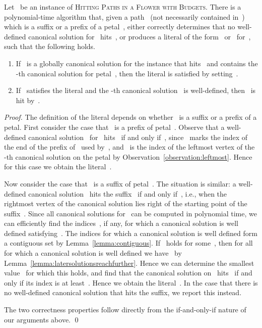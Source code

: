 \let\accentvec\vec  \documentclass{llncs}
\newcommand{\HitPathsInFlower}{\textsc{Hitting Paths in a Flower with Budgets}\xspace}
\begin{document}
\begin{lemma} \label{lemma:createliteral}
Let~ be an instance of \HitPathsInFlower. There is a polynomial-time algorithm that, given a path~ (not necessarily contained in~) which is a suffix or a prefix of a petal~, either correctly determines that no well-defined canonical solution for~ hits~, or produces a literal of the form~ or~ for~, such that the following holds.
\begin{enumerate}
	\item If~ is a globally canonical solution for the instance that hits~ and contains the -th canonical solution for petal~, then the literal is satisfied by setting~.
	\item If~ satisfies the literal and the -th canonical solution~ is well-defined, then~ is hit by~.
\end{enumerate}
\end{lemma}
\begin{proof}
The definition of the literal depends on whether~ is a suffix or a prefix of a petal. First consider the case that~ is a prefix of petal~. Observe that a well-defined canonical solution~ for~ hits~ if and only if~, since~ marks the index of the end of the prefix of~ used by~, and~ is the index of the leftmost vertex of the -th canonical solution on the petal by Observation~\ref{observation:leftmost}. Hence for this case we obtain the literal~.

Now consider the case that~ is a suffix of petal~. The situation is similar: a well-defined canonical solution~ hits the suffix~ if and only if~, i.e., when the rightmost vertex of the canonical solution lies right of the starting point of the suffix~. Since all canonical solutions for~ can be computed in polynomial time, we can efficiently find the indices~, if any, for which a canonical solution is well defined satisfying~. The indices for which a canonical solution is well defined form a contiguous set by Lemma~\ref{lemma:contiguous}. If~ holds for some~, then for all~ for which a canonical solution is well defined we have~ by Lemma~\ref{lemma:latersolutionsreachfurther}. Hence we can determine the smallest value~ for which this holds, and find that the canonical solution on~ hits~ if and only if its index is at least~. Hence we obtain the literal~. In the case that there is no well-defined canonical solution that hits the suffix, we report this instead.

The two correctness properties follow directly from the if-and-only-if nature of our arguments above.
\qed
\end{proof}
\end{document}
